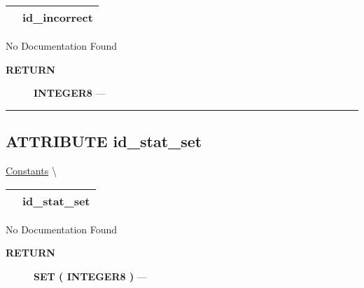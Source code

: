 {\renewcommand{\arraystretch}{1.5}
\begin{tabularx}{\textwidth}{|>{\raggedright\arraybackslash}l|X|}
\hline
\hspace{0pt}\mytexttt{\color{red} } & \textbf{id\_incorrect} \\
\hline
\end{tabularx}
}

\par





No Documentation Found








\par
\begin{description}
\item [\colorbox{tagtype}{\color{white} \textbf{\textsf{RETURN}}}] \textbf{INTEGER8} --- 
\end{description}




\rule{\linewidth}{0.5pt}
\subsection*{\textsf{\colorbox{headtoc}{\color{white} ATTRIBUTE}
id\_stat\_set}}

\hypertarget{ecldoc:constants.id_stat_set}{}
\hspace{0pt} \hyperlink{ecldoc:Constants}{Constants} \textbackslash 

{\renewcommand{\arraystretch}{1.5}
\begin{tabularx}{\textwidth}{|>{\raggedright\arraybackslash}l|X|}
\hline
\hspace{0pt}\mytexttt{\color{red} } & \textbf{id\_stat\_set} \\
\hline
\end{tabularx}
}

\par





No Documentation Found








\par
\begin{description}
\item [\colorbox{tagtype}{\color{white} \textbf{\textsf{RETURN}}}] \textbf{SET ( INTEGER8 )} --- 
\end{description}




